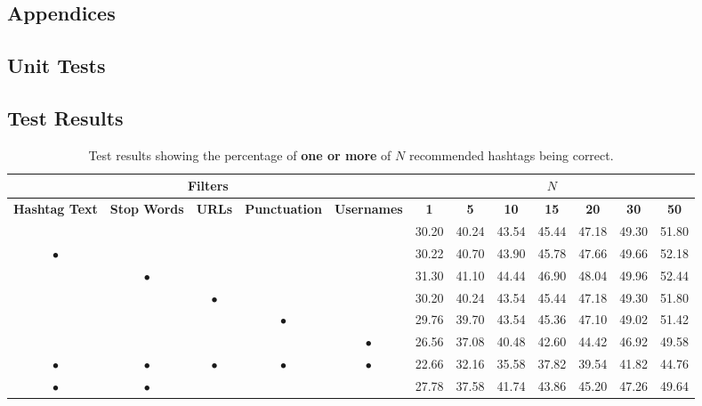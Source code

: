 \documentclass[11pt,a4paper]{report}
\renewcommand{\arraystretch}{1.5}
\begin{document}
\begin{subappendices}
\renewcommand\thesection{\Alph{section}}
\chapter*{Appendices}

\section{Unit Tests}
\label{appendix:unittests}
\pagebreak

\renewcommand{\arraystretch}{1.1}
\begin{landscape}
\section{Test Results}
\label{appendix:testresults}
\begin{table}[H]
    \centering
    \small
    \begin{tabular}{|c|c|c|c|c||c|c|c|c|c|c|c|}
        \hline
        \multicolumn{5}{|c||}{Filters} & \multicolumn{7}{|c|}{$N$} \\
        \hline
        \textbf{Hashtag Text} & \textbf{Stop Words} & \textbf{URLs} & \textbf{Punctuation} & \textbf{Usernames} & \textbf{1} & \textbf{5} & \textbf{10} & \textbf{15} & \textbf{20} & \textbf{30} & \textbf{50} \\
        \hline
        \hline
        & & & & & 30.20 & 40.24 & 43.54 & 45.44 & 47.18 & 49.30 & 51.80 \\
        \hline
        $\bullet$ & & & & & 30.22 & 40.70 & 43.90 & 45.78 & 47.66 & 49.66 & 52.18 \\
        \hline
        & $\bullet$ & & & & 31.30 & 41.10 & 44.44 & 46.90 & 48.04 & 49.96 & 52.44 \\
        \hline
        & & $\bullet$ & & & 30.20 & 40.24 & 43.54 & 45.44 & 47.18 & 49.30 & 51.80 \\
        \hline
        & & & $\bullet$ & & 29.76 & 39.70 & 43.54 & 45.36 & 47.10 & 49.02 & 51.42 \\
        \hline
        & & & & $\bullet$ & 26.56 & 37.08 & 40.48 & 42.60 & 44.42 & 46.92 & 49.58 \\
        \hline
        $\bullet$ & $\bullet$ & $\bullet$ & $\bullet$ & $\bullet$ & 22.66 & 32.16 & 35.58 & 37.82 & 39.54 & 41.82 & 44.76 \\
        \hline
        $\bullet$ & $\bullet$ & & & & 27.78 & 37.58 & 41.74 & 43.86 & 45.20 & 47.26 & 49.64 \\
        \hline
    \end{tabular}
    \caption*{Test results showing the percentage of \textbf{one or more} of $N$ recommended hashtags being correct.}
\end{table}


\end{landscape}
\end{subappendices}
\end{document}
